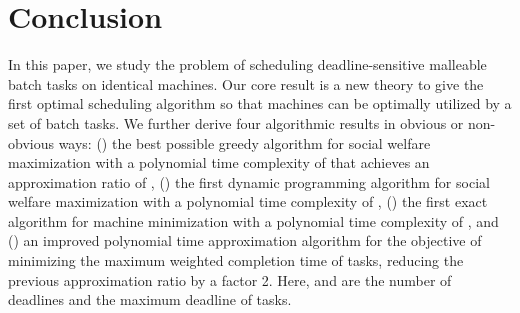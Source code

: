 \documentclass[10pt,journal,compsoc]{IEEEtran}
\newcommand{\rmnum}[1]{\romannumeral #1}
\begin{document}
\section{Conclusion}
\label{sec.conclusion}


In this paper, we study the problem of scheduling  deadline-sensitive malleable batch tasks on  identical machines. Our core result is a new theory to give the first optimal scheduling algorithm so that  machines can be optimally utilized by a set of batch tasks. We further derive four algorithmic results in obvious or non-obvious ways: (\rmnum{1}) the best possible greedy algorithm for social welfare maximization with a polynomial time complexity of  that achieves an approximation ratio of , (\rmnum{2}) the first dynamic programming algorithm for social welfare maximization with a polynomial time complexity of , (\rmnum{3}) the first exact algorithm for machine minimization with a polynomial time complexity of , and (\rmnum{4}) an improved polynomial time approximation algorithm for the objective of minimizing the maximum weighted completion time of tasks, reducing the previous approximation ratio by a factor 2. Here,  and  are the number of deadlines and the maximum deadline of tasks.
\end{document}
